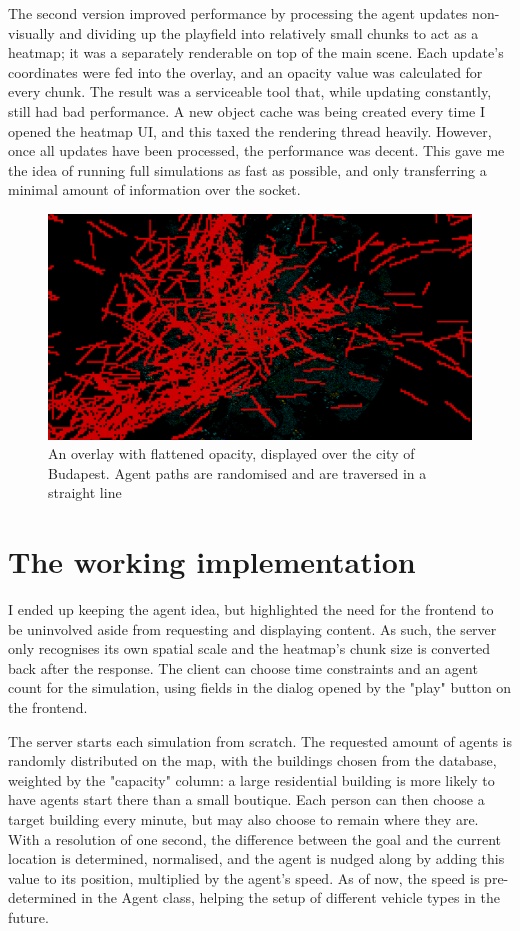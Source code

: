 The second version improved performance by processing the agent updates non-visually and dividing up the playfield into relatively small chunks to act as a heatmap; it was a separately renderable on top of the main scene. Each update's coordinates were fed into the overlay, and an opacity value was calculated for every chunk. The result was a serviceable tool that, while updating constantly, still had bad performance. A new object cache was being created every time I opened the heatmap UI, and this taxed the rendering thread heavily. However, once all updates have been processed, the performance was decent. This gave me the idea of running full simulations as fast as possible, and only transferring a minimal amount of information over the socket.
\begin{figure}[h]
    \centering
    \includegraphics[width=140mm, keepaspectratio]{images/overlay_v2.png}
    \caption{An overlay with flattened opacity, displayed over the city of Budapest. Agent paths are randomised and are traversed in a straight line\ \label{overlay_v2}}
\end{figure}

\section{The working implementation}

I ended up keeping the agent idea, but highlighted the need for the frontend to be uninvolved aside from requesting and displaying content. As such, the server only recognises its own spatial scale and the heatmap's chunk size is converted back after the response. The client can choose time constraints and an agent count for the simulation, using fields in the dialog opened by the "play" button on the frontend.

The server starts each simulation from scratch. The requested amount of agents is randomly distributed on the map, with the buildings chosen from the database, weighted by the "capacity" column: a large residential building is more likely to have agents start there than a small boutique. Each person can then choose a target building every minute, but may also choose to remain where they are. With a resolution of one second, the difference between the goal and the current location is determined, normalised, and the agent is nudged along by adding this value to its position, multiplied by the agent's speed. As of now, the speed is pre-determined in the Agent class, helping the setup of different vehicle types in the future.

